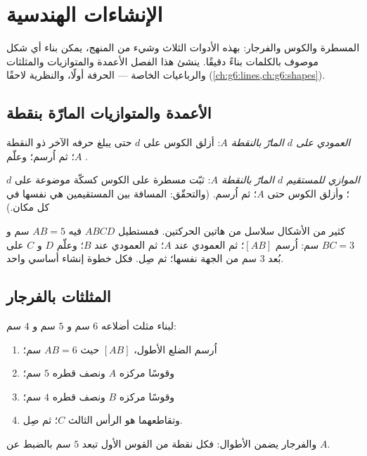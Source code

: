 \chapter{الإنشاءات الهندسية}\label{ch:g5:geometry}

المسطرة والكوس والفرجار: بهذه الأدوات الثلاث وشيء من
المنهج، يمكن بناء أي شكل موصوف بالكلمات بناءً دقيقًا. ينشئ
هذا الفصل الأعمدة والمتوازيات والمثلثات والرباعيات
الخاصة --- الحرفة أولًا، والنظرية لاحقًا
(\cref{ch:g6:lines,ch:g6:shapes}).

\section{الأعمدة والمتوازيات المارّة بنقطة}

\begin{method}\label{met:g5:geometry:basic}
\emph{العمودي على $d$ المارّ بالنقطة $A$}: أزلق الكوس على
$d$ حتى يبلغ حرفه الآخر ذو  النقطة $A$؛ ثم اُرسم؛
وعلّم .

\emph{الموازي للمستقيم $d$ المارّ بالنقطة $A$}: ثبّت مسطرة على
الكوس كسكّة موضوعة على $d$؛ وأزلق الكوس حتى $A$؛
ثم اُرسم. (والتحقّق: المسافة بين المستقيمين هي نفسها في كل
مكان.)
\end{method}

\begin{example}\label{ex:g5:geometry:chain}
كثير من الأشكال سلاسل من هاتين الحركتين. فمستطيل $ABCD$ فيه
$AB = 5$ سم و $BC = 3$ سم: اُرسم $[AB]$؛ ثم العمودي عند $A$؛
ثم العمودي عند $B$؛ وعلّم $D$ و $C$ على بُعد $3$ سم من الجهة نفسها؛
ثم صِل. فكل خطوة إنشاء أساسي واحد.
\end{example}

\section{المثلثات بالفرجار}

\begin{method}\label{met:g5:geometry:triangle}
لبناء مثلث أضلاعه $6$ سم و $5$ سم و $4$ سم:
\begin{enumerate}
  \item اُرسم الضلع الأطول، $[AB]$ حيث $AB = 6$ سم؛
  \item وقوسًا مركزه $A$ ونصف قطره $5$ سم؛
  \item وقوسًا مركزه $B$ ونصف قطره $4$ سم؛
  \item وتقاطعهما هو الرأس الثالث $C$؛ ثم صِل.
\end{enumerate}
والفرجار يضمن الأطوال: فكل نقطة من القوس الأول تبعد
$5$ سم بالضبط عن $A$.
\end{method}

